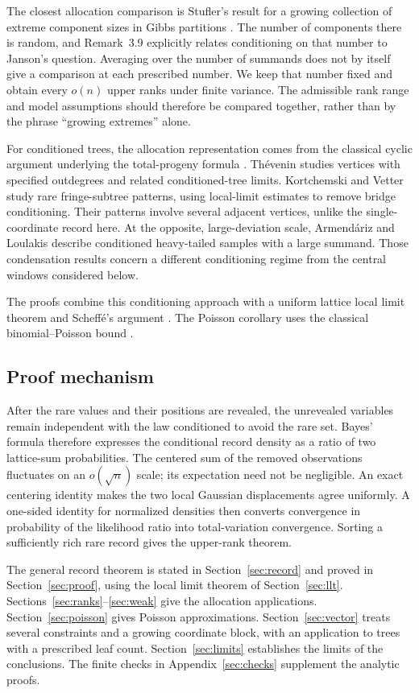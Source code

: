 The closest allocation comparison is Stufler's result for a growing collection of extreme component sizes in Gibbs partitions \cite[Corollary~3.6]{Stufler}. The number of components there is random, and Remark~3.9 explicitly relates conditioning on that number to Janson's question. Averaging over the number of summands does not by itself give a comparison at each prescribed number. We keep that number fixed and obtain every $o(n)$ upper ranks under finite variance. The admissible rank range and model assumptions should therefore be compared together, rather than by the phrase ``growing extremes'' alone.

For conditioned trees, the allocation representation comes from the classical cyclic argument underlying the total-progeny formula \cite{Dwass,Janson}. Th\'evenin \cite{Thevenin} studies vertices with specified outdegrees and related conditioned-tree limits. Kortchemski and Vetter \cite{KV} study rare fringe-subtree patterns, using local-limit estimates to remove bridge conditioning. Their patterns involve several adjacent vertices, unlike the single-coordinate record here. At the opposite, large-deviation scale, Armend\'ariz and Loulakis \cite{AL} describe conditioned heavy-tailed samples with a large summand. Those condensation results concern a different conditioning regime from the central windows considered below.

The proofs combine this conditioning approach with a uniform lattice local limit theorem and Scheff\'e's argument \cite{Scheffe}. The Poisson corollary uses the classical binomial--Poisson bound \cite{BH,AGG}.

\subsection{Proof mechanism}
After the rare values and their positions are revealed, the unrevealed variables remain independent with the law conditioned to avoid the rare set. Bayes' formula therefore expresses the conditional record density as a ratio of two lattice-sum probabilities. The centered sum of the removed observations fluctuates on an $o(\sqrt n)$ scale; its expectation need not be negligible. An exact centering identity makes the two local Gaussian displacements agree uniformly. A one-sided identity for normalized densities then converts convergence in probability of the likelihood ratio into total-variation convergence. Sorting a sufficiently rich rare record gives the upper-rank theorem.

The general record theorem is stated in Section~\ref{sec:record} and proved in Section~\ref{sec:proof}, using the local limit theorem of Section~\ref{sec:llt}. Sections~\ref{sec:ranks}--\ref{sec:weak} give the allocation applications. Section~\ref{sec:poisson} gives Poisson approximations. Section~\ref{sec:vector} treats several constraints and a growing coordinate block, with an application to trees with a prescribed leaf count. Section~\ref{sec:limits} establishes the limits of the conclusions. The finite checks in Appendix~\ref{sec:checks} supplement the analytic proofs.

